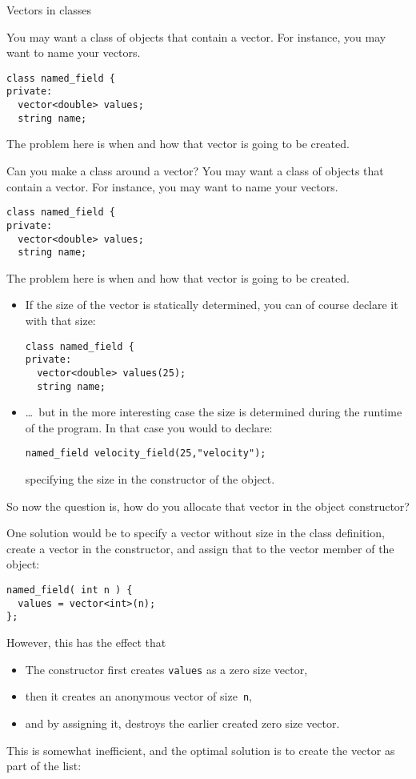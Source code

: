  {Vectors in classes}
\label{sec:class-w-vector}

You may want a class of objects that contain a vector.
For instance, you may want to name your vectors.
\begin{lstlisting}
class named_field {
private:
  vector<double> values;
  string name;
\end{lstlisting}
The problem here is when and how that vector is going to be created.

\begin{slide}{Can you make a class around a vector?}
  \label{sl:class-with-vector}
You may want a class of objects that contain a vector.
For instance, you may want to name your vectors.
\begin{lstlisting}
class named_field {
private:
  vector<double> values;
  string name;
\end{lstlisting}
The problem here is when and how that vector is going to be created.
\end{slide}

\begin{itemize}
\item If the size of the vector is statically determined,
  you can of course declare it with that size:
\begin{lstlisting}
class named_field {
private:
  vector<double> values(25);
  string name;
\end{lstlisting}
\item \ldots~but in the more interesting case the size is determined
  during the runtime of the program. In that case you would to declare:
\begin{lstlisting}
named_field velocity_field(25,"velocity");
\end{lstlisting}
specifying the size in the constructor of the object.
\end{itemize}

So now the question is, how do you allocate that vector
in the object constructor?

One solution would be to specify a vector without size in the class
definition, create a vector in the constructor, and assign that
to the vector member of the object:
\begin{lstlisting}
named_field( int n ) {
  values = vector<int>(n);
};
\end{lstlisting}
However, this has the effect that
\begin{itemize}
\item The constructor first creates \lstinline{values} as a zero size vector,
\item then it creates an anonymous vector of size~\lstinline{n},
\item and by assigning it, destroys the earlier created zero size vector.
\end{itemize}
This is somewhat inefficient, and the optimal solution is
to create the vector as part of the
 list:

